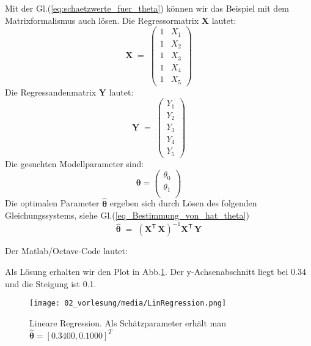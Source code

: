 Mit der Gl.(\ref{eq:schaetzwerte_fuer_theta}) können wir
das Beispiel mit dem Matrixformalismus auch lösen.
Die Regressormatrix $\boldsymbol X$ lautet:
\begin{equation}
	\boldsymbol{X} \; = \;
	\left(
	\begin{array}{cc}
		1 & X_1 \\
	    1 & X_2 \\
		1 & X_3 \\
		1 & X_4 \\
		1 & X_5
	\end{array}
	\right)
\end{equation}
Die Regressandenmatrix $\boldsymbol Y$ lautet:
\begin{equation}
	\boldsymbol{Y} \; = \;
	\left(
	\begin{array}{cc}
		 Y_1 \\
		 Y_2 \\
		 Y_3 \\
		 Y_4 \\
		 Y_5
	\end{array}
	\right)
\end{equation}
Die gesuchten Modellparameter sind:
\[
\boldsymbol\theta = \left(
\begin{array}{cc}
	\theta_0 \\
	\theta_1 \\
\end{array}
\right)
\]
Die optimalen Parameter $\boldsymbol{\hat \theta}$ ergeben sich durch Lösen
des folgenden Gleichungssystems, siehe Gl.(\ref{eq_Bestimmung_von_hat_theta})
\[
	\boldsymbol{\hat \theta} \; = \;
	\left( \mathbf{X}^\mathsf{T}  \, \mathbf{X} \right)^{-1} \mathbf{X}^\mathsf{T} \, \mathbf{Y}
\]

Der Matlab/Octave-Code lautet:


Als Lösung erhalten wir den Plot in Abb.\ref{fig:LineareRegression}.
Der y-Achsenabschnitt liegt bei 0.34 und die Steigung ist 0.1.
\begin{figure}[!htp]
	\begin{center}
		\texttt{[image: 02\_vorlesung/media/LinRegression.png]}
		\caption{Lineare Regression.
			Als Schätzparameter erhält man $\hat{\boldsymbol\theta} = [ 0.3400 ,0.1000 ]^T$}
		\label{fig:LineareRegression}
	\end{center}
\end{figure}

